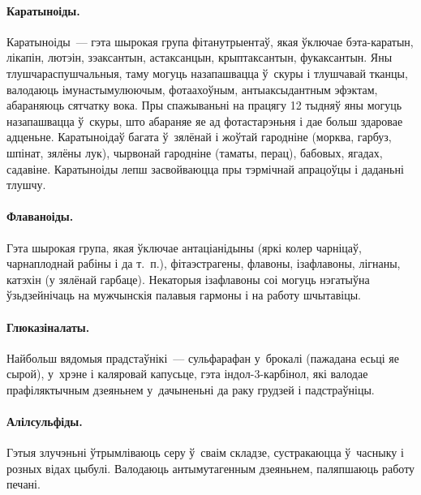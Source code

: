 
\paragraph{Каратыноіды.}
Каратыноіды~--- гэта шырокая група фітанутрыентаў, якая ўключае бэта-каратын, лікапін, лютэін, зэаксантын, астаксанцын, крыптаксантын, фукаксантын. Яны тлушчараспушчальныя, таму могуць назапашвацца ў~скуры і тлушчавай тканцы, валодаюць імунастымулюючым, фотаахоўным, антыаксыдантным эфэктам, абараняюць сятчатку вока. Пры спажываньні на працягу 12 тыдняў яны могуць назапашвацца ў~скуры, што абараняе яе ад фотастарэньня і дае больш здаровае адценьне. Каратыноідаў багата ў~зялёнай і жоўтай гародніне (морква, гарбуз, шпінат, зялёны лук), чырвонай гародніне (таматы, перац), бабовых, ягадах, садавіне. Каратыноіды лепш засвойваюцца пры тэрмічнай апрацоўцы і даданьні тлушчу.

\paragraph{Флаваноіды.}
Гэта шырокая група, якая ўключае антаціанідыны (яркі колер чарніцаў, чарнаплоднай рабіны і да т.~п.), фітаэстрагены, флавоны, ізафлавоны, лігнаны, катэхін (у зялёнай гарбаце). Некаторыя ізафлавоны соі могуць нэгатыўна ўзьдзейнічаць на мужчынскія палавыя гармоны і на работу шчытавіцы.

\paragraph{Глюказіналаты.}
Найбольш вядомыя прадстаўнікі~--- сульфарафан у~брокалі (пажадана есьці яе сырой), у~хрэне і каляровай капусьце, гэта індол-3-карбінол, які валодае прафіляктычным дзеяньнем у~дачыненьні да раку грудзей і падстраўніцы.

\paragraph{Алілсульфіды.}
Гэтыя злучэньні ўтрымліваюць серу ў~сваім складзе, сустракаюцца ў~часныку і розных відах цыбулі. Валодаюць антымутагенным дзеяньнем, паляпшаюць работу печані.

